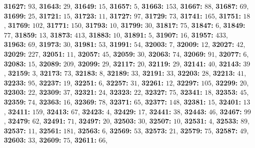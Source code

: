 \textsf{\bfseries 31627:} $93$, \textsf{\bfseries 31643:} $29$, \textsf{\bfseries 31649:} $15$, \textsf{\bfseries 31657:} $5$, \textsf{\bfseries 31663:} $153$, \textsf{\bfseries 31667:} $88$, \textsf{\bfseries 31687:} $69$, \textsf{\bfseries 31699:} $25$, \textsf{\bfseries 31721:} $15$, \textsf{\bfseries 31723:} $11$, \textsf{\bfseries 31727:} $97$, \textsf{\bfseries 31729:} $73$, \textsf{\bfseries 31741:} $165$, \textsf{\bfseries 31751:} $18$, \textsf{\bfseries 31769:} $102$, \textsf{\bfseries 31771:} $150$, \textsf{\bfseries 31793:} $10$, \textsf{\bfseries 31799:} $30$, \textsf{\bfseries 31817:} $75$, \textsf{\bfseries 31847:} $6$, \textsf{\bfseries 31849:} $77$, \textsf{\bfseries 31859:} $13$, \textsf{\bfseries 31873:} $413$, \textsf{\bfseries 31883:} $10$, \textsf{\bfseries 31891:} $5$, \textsf{\bfseries 31907:} $16$, \textsf{\bfseries 31957:} $433$, \textsf{\bfseries 31963:} $69$, \textsf{\bfseries 31973:} $30$, \textsf{\bfseries 31981:} $53$, \textsf{\bfseries 31991:} $54$, \textsf{\bfseries 32003:} $7$, \textsf{\bfseries 32009:} $12$, \textsf{\bfseries 32027:} $42$, \textsf{\bfseries 32029:} $227$, \textsf{\bfseries 32051:} $11$, \textsf{\bfseries 32057:} $45$, \textsf{\bfseries 32059:} $30$, \textsf{\bfseries 32063:} $74$, \textsf{\bfseries 32069:} $91$, \textsf{\bfseries 32077:} $6$, \textsf{\bfseries 32083:} $15$, \textsf{\bfseries 32089:} $209$, \textsf{\bfseries 32099:} $29$, \textsf{\bfseries 32117:} $20$, \textsf{\bfseries 32119:} $29$, \textsf{\bfseries 32141:} $40$, \textsf{\bfseries 32143:} $39$, \textsf{\bfseries 32159:} $3$, \textsf{\bfseries 32173:} $73$, \textsf{\bfseries 32183:} $8$, \textsf{\bfseries 32189:} $33$, \textsf{\bfseries 32191:} $33$, \textsf{\bfseries 32203:} $28$, \textsf{\bfseries 32213:} $41$, \textsf{\bfseries 32233:} $95$, \textsf{\bfseries 32237:} $19$, \textsf{\bfseries 32251:} $6$, \textsf{\bfseries 32257:} $31$, \textsf{\bfseries 32261:} $12$, \textsf{\bfseries 32297:} $105$, \textsf{\bfseries 32299:} $20$, \textsf{\bfseries 32303:} $22$, \textsf{\bfseries 32309:} $37$, \textsf{\bfseries 32321:} $24$, \textsf{\bfseries 32323:} $22$, \textsf{\bfseries 32327:} $75$, \textsf{\bfseries 32341:} $18$, \textsf{\bfseries 32353:} $45$, \textsf{\bfseries 32359:} $74$, \textsf{\bfseries 32363:} $16$, \textsf{\bfseries 32369:} $78$, \textsf{\bfseries 32371:} $65$, \textsf{\bfseries 32377:} $148$, \textsf{\bfseries 32381:} $15$, \textsf{\bfseries 32401:} $13$, \textsf{\bfseries 32411:} $159$, \textsf{\bfseries 32413:} $67$, \textsf{\bfseries 32423:} $4$, \textsf{\bfseries 32429:} $17$, \textsf{\bfseries 32441:} $38$, \textsf{\bfseries 32443:} $46$, \textsf{\bfseries 32467:} $99$, \textsf{\bfseries 32479:} $62$, \textsf{\bfseries 32491:} $71$, \textsf{\bfseries 32497:} $20$, \textsf{\bfseries 32503:} $30$, \textsf{\bfseries 32507:} $10$, \textsf{\bfseries 32531:} $4$, \textsf{\bfseries 32533:} $89$, \textsf{\bfseries 32537:} $11$, \textsf{\bfseries 32561:} $181$, \textsf{\bfseries 32563:} $6$, \textsf{\bfseries 32569:} $53$, \textsf{\bfseries 32573:} $21$, \textsf{\bfseries 32579:} $75$, \textsf{\bfseries 32587:} $49$, \textsf{\bfseries 32603:} $33$, \textsf{\bfseries 32609:} $75$, \textsf{\bfseries 32611:} $66$, 
